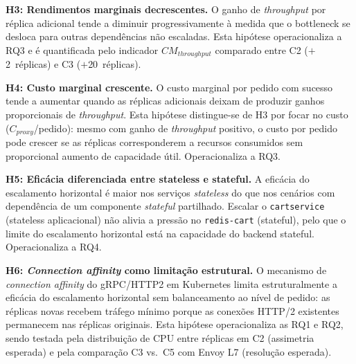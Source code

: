 \documentclass[manuscript,oneside]{acmart}
\begin{document}
\textbf{H3: Rendimentos marginais decrescentes.} O ganho de \textit{throughput} por réplica adicional tende a diminuir progressivamente à medida que o bottleneck se desloca para outras dependências não escaladas. Esta hipótese operacionaliza a RQ3 e é quantificada pelo indicador $CM_{throughput}$ comparado entre C2 ($+$2~réplicas) e C3 ($+$20~réplicas).

\textbf{H4: Custo marginal crescente.} O custo marginal por pedido com sucesso tende a aumentar quando as réplicas adicionais deixam de produzir ganhos proporcionais de \textit{throughput}. Esta hipótese distingue-se de H3 por focar no custo ($C_{proxy}$/pedido): mesmo com ganho de \textit{throughput} positivo, o custo por pedido pode crescer se as réplicas corresponderem a recursos consumidos sem proporcional aumento de capacidade útil. Operacionaliza a RQ3.

\textbf{H5: Eficácia diferenciada entre stateless e stateful.} A eficácia do escalamento horizontal é maior nos serviços \textit{stateless} do que nos cenários com dependência de um componente \textit{stateful} partilhado. Escalar o \texttt{cartservice} (stateless aplicacional) não alivia a pressão no \texttt{redis-cart} (stateful), pelo que o limite do escalamento horizontal está na capacidade do backend stateful. Operacionaliza a RQ4.

\textbf{H6: \textit{Connection affinity} como limitação estrutural.} O mecanismo de \textit{connection affinity} do gRPC/HTTP2 em Kubernetes limita estruturalmente a eficácia do escalamento horizontal sem balanceamento ao nível de pedido: as réplicas novas recebem tráfego mínimo porque as conexões HTTP/2 existentes permanecem nas réplicas originais. Esta hipótese operacionaliza as RQ1 e RQ2, sendo testada pela distribuição de CPU entre réplicas em C2 (assimetria esperada) e pela comparação C3 vs.\ C5 com Envoy L7 (resolução esperada).
\end{document}
